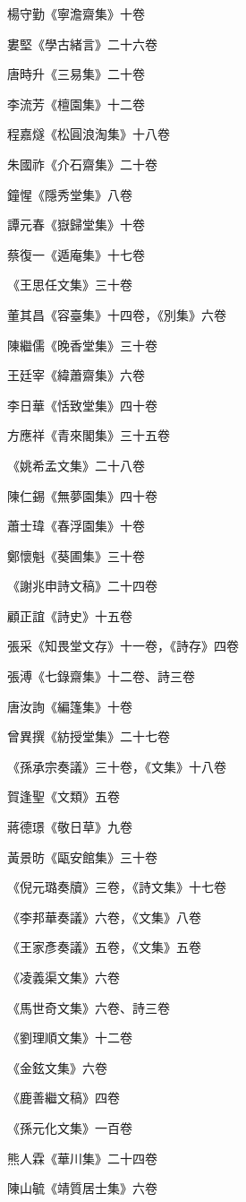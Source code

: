 楊守勤《寧澹齋集》十卷

婁堅《學古緒言》二十六卷

唐時升《三易集》二十卷

李流芳《檀園集》十二卷

程嘉燧《松圓浪淘集》十八卷

朱國祚《介石齋集》二十卷

鐘惺《隱秀堂集》八卷

譚元春《嶽歸堂集》十卷

蔡復一《遁庵集》十七卷

《王思任文集》三十卷

董其昌《容臺集》十四卷，《別集》六卷

陳繼儒《晚香堂集》三十卷

王廷宰《緯蕭齋集》六卷

李日華《恬致堂集》四十卷

方應祥《青來閣集》三十五卷

《姚希孟文集》二十八卷

陳仁錫《無夢園集》四十卷

蕭士瑋《春浮園集》十卷

鄭懷魁《葵圃集》三十卷

《謝兆申詩文稿》二十四卷

顧正誼《詩史》十五卷

張采《知畏堂文存》十一卷，《詩存》四卷

張溥《七錄齋集》十二卷、詩三卷

唐汝詢《編篷集》十卷

曾異撰《紡授堂集》二十七卷

《孫承宗奏議》三十卷，《文集》十八卷

賀逢聖《文類》五卷

蔣德璟《敬日草》九卷

黃景昉《甌安館集》三十卷

《倪元璐奏牘》三卷，《詩文集》十七卷

《李邦華奏議》六卷，《文集》八卷

《王家彥奏議》五卷，《文集》五卷

《凌義渠文集》六卷

《馬世奇文集》六卷、詩三卷

《劉理順文集》十二卷

《金鉉文集》六卷

《鹿善繼文稿》四卷

《孫元化文集》一百卷

熊人霖《華川集》二十四卷

陳山毓《靖質居士集》六卷

